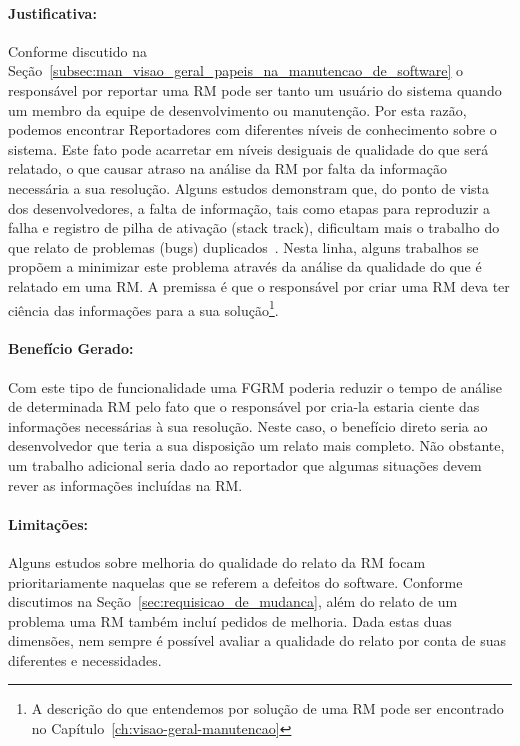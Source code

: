 
\paragraph{Justificativa:}
\label{par:justificativa_s01}

Conforme discutido na
Seção~\ref{subsec:man_visao_geral_papeis_na_manutencao_de_software} o
responsável por reportar uma RM pode ser tanto um usuário do sistema quando um
membro da equipe de desenvolvimento ou manutenção. Por esta razão, podemos
encontrar Reportadores com diferentes níveis de conhecimento sobre o sistema.
Este fato pode acarretar em níveis desiguais de qualidade do que será relatado,
o que causar atraso na análise da RM por falta da informação necessária a sua
resolução. Alguns estudos demonstram que, do ponto de vista dos desenvolvedores,
a falta de informação, tais como etapas para reproduzir a falha e registro de
pilha de ativação (stack track), dificultam mais o trabalho do que relato de
problemas (bugs) duplicados~\cite{bettenburg2008makes, bettenburg2007quality}.
Nesta linha, alguns trabalhos se propõem a minimizar este problema através da
análise da qualidade do que é relatado em uma RM\@. A premissa é que o
responsável por criar uma RM deva ter ciência das informações para a sua
solução\footnote{A descrição do que entendemos por solução de uma RM pode ser
	encontrado no Capítulo~\ref{ch:visao-geral-manutencao}}.

\paragraph{Benefício Gerado:}
\label{par:beneficio_s01}

Com este tipo de funcionalidade uma FGRM poderia reduzir o tempo de análise de
determinada RM pelo fato que o responsável por cria-la estaria ciente das
informações necessárias à sua resolução. Neste caso, o benefício direto seria ao
desenvolvedor que teria a sua disposição um relato mais completo. Não obstante,
um trabalho adicional seria dado ao reportador que algumas situações devem rever
as informações incluídas na RM\@.

\paragraph{Limitações:}
\label{par:limitacoes_s01}

Alguns estudos sobre melhoria do qualidade do relato da RM focam
prioritariamente naquelas que se referem a defeitos do software. Conforme
discutimos na Seção~\ref{sec:requisicao_de_mudanca}, além do relato de um
problema uma RM também incluí pedidos de melhoria. Dada estas duas dimensões,
nem sempre é possível avaliar a qualidade do relato por conta de suas diferentes
e necessidades.

